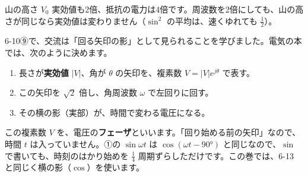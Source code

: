 \begin{phbaisuru}{山の高さ $V_0$}
実効値も2倍、抵抗の電力は4倍です。周波数を2倍にしても、山の高さが同じなら実効値は変わりません（$\sin^2$ の平均は、速くゆれても $\tfrac12$）。
\end{phbaisuru}


\leavevmode\label{ph:電-10:sec3}6-10⑨で、交流は「回る矢印の影」として見られることを学びました。電気の本では、次のように決めます。
\begin{enumerate}[label={\bkcircled{\arabic*}}, leftmargin=2.4\zw, itemsep=2pt, topsep=2pt]
\item 長さが\textbf{実効値} $\lvert V\rvert$、角が $\theta$ の矢印を、複素数 $V=\lvert V\rvert e^{j\theta}$ で表す。
\item この矢印を $\sqrt2$ 倍し、角周波数 $\omega$ で左回りに回す。
\item その横の影（実部）が、時間で変わる電圧になる。
\end{enumerate}
\label{ph:電-10:phasor}この複素数 $V$ を、電圧の\textbf{フェーザ}といいます。「回り始める前の矢印」なので、時間 $t$ は入っていません。①の $\sin\omega t$ は $\cos(\omega t-90°)$ と同じなので、$\sin$ で書いても、時刻のはかり始めを $\tfrac14$ 周期ずらしただけです。この巻では、6-13 と同じく横の影（$\cos$）を使います。

